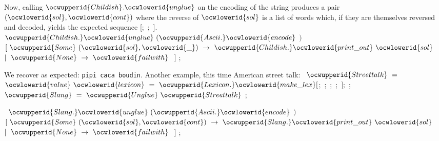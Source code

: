 \documentclass[12pt]{article}
\begin{document}
\ocwendcode{}\ocwindent{0.00em}
Now, calling \ocwbegindcode{}$\ocwupperid{Childish}.\ocwlowerid{unglue}$\ocwenddcode{} on the encoding of the string 
\ocwbegindcode{}\ocwenddcode{} produces a pair \ocwbegindcode{}$(\ocwlowerid{sol},\ocwlowerid{cont})$\ocwenddcode{} where the reverse of \ocwbegindcode{}$\ocwlowerid{sol}$\ocwenddcode{} is 
a list of words which, if they are themselves reversed and decoded, 
yields the expected sequence \ocwbegindcode{}[;~;~]\ocwenddcode{}. 
\ocweol
\label{../ML/unglue_test.ml:1513}%
\medskip
\ocwbegincode{}\ocwindent{0.00em}
~$\ocwupperid{Childish.}\ocwlowerid{unglue}~(\ocwupperid{Ascii.}\ocwlowerid{encode}~$$)~$\ocweol
\ocwindent{1.00em}
$[~\ocwupperid{Some}~(\ocwlowerid{sol},\ocwlowerid{\_})~\rightarrow{}~\ocwupperid{Childish.}\ocwlowerid{print\_out}~\ocwlowerid{sol}$\ocweol
\ocwindent{1.00em}
$\mid{}~\ocwupperid{None}~\rightarrow{}~\ocwlowerid{failwith}~$\ocweol
\ocwindent{1.00em}
$]$\ocweol
\ocwindent{0.00em}
;\medskip

\ocwendcode{}\ocwindent{0.00em}
We recover as expected: \verb:pipi caca boudin:.     
\ocweol
\ocwindent{0.00em}
Another example, this time American street talk:     
\ocweol
\label{../ML/unglue_test.ml:1829}%
\medskip
\ocwbegincode{}\ocwindent{0.00em}
~$\ocwupperid{Streettalk}~=~$\ocweol
\ocwindent{0.00em}
$\ocwlowerid{value}~\ocwlowerid{lexicon}~=~\ocwupperid{Lexicon.}\ocwlowerid{make\_lex}[$;~;~;~;~$];$\ocweol
\ocwindent{0.00em}
\ocweol
\ocwindent{0.00em}
;\ocweol
\ocwindent{0.00em}
~$\ocwupperid{Slang}~=~\ocwupperid{Unglue}~\ocwupperid{Streettalk}$\ocweol
\ocwindent{0.00em}
;\medskip

\label{../ML/unglue_test.ml:1971}%
\ocwindent{0.00em}
~$\ocwupperid{Slang.}\ocwlowerid{unglue}~(\ocwupperid{Ascii.}\ocwlowerid{encode}~$$)~$~\ocweol
\ocwindent{1.00em}
$[~\ocwupperid{Some}~(\ocwlowerid{sol},\ocwlowerid{cont})~\rightarrow{}~\ocwupperid{Slang.}\ocwlowerid{print\_out}~\ocwlowerid{sol}$\ocweol
\ocwindent{1.00em}
$\mid{}~\ocwupperid{None}~\rightarrow{}~\ocwlowerid{failwith}~$\ocweol
\ocwindent{1.00em}
$]$\ocweol
\ocwindent{0.00em}
;\medskip
\end{document}
